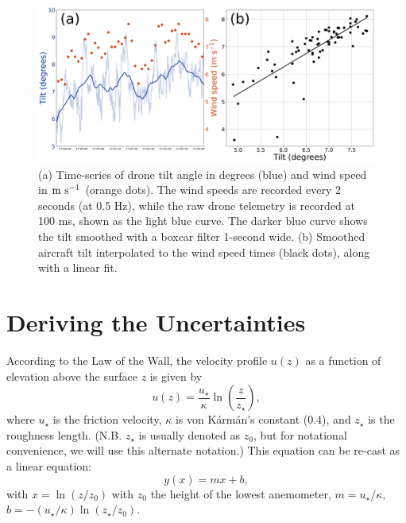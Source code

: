 \documentclass[linenumbers]{aastex631}
\begin{document}
\begin{figure}
    \centering
    \includegraphics[width=\textwidth]{figures and data/example_tilt_and_windspeed.jpg}
    \caption{(a) Time-series of drone tilt angle in degrees (blue) and wind speed in ${\rm m\ s^{-1}}$ (orange dots). The wind speeds are recorded every 2 seconds (at 0.5 Hz), while the raw drone telemetry is recorded at 100 ms, shown as the light blue curve. The darker blue curve shows the tilt smoothed with a boxcar filter 1-second wide. (b) Smoothed aircraft tilt interpolated to the wind speed times (black dots), along with a linear fit.}
    \label{fig:example_tilt_and_windspeed}
\end{figure}

\appendix
\section{Deriving the Uncertainties}

According to the Law of the Wall, the velocity profile $u(z)$ as a function of elevation above the surface $z$ is given by
\begin{equation}
    u(z) = \frac{u_\star}{\kappa} \ln \left( \frac{z}{z_\star} \right),\label{eqn:uz_profile}
\end{equation}
where $u_\star$ is the friction velocity, $\kappa$ is von K\'{a}rm\'{a}n's constant (0.4), and $z_\star$ is the roughness length. (N.B. $z_\star$ is usually denoted as $z_0$, but for notational convenience, we will use this alternate notation.) This equation can be re-cast as a linear equation:
\begin{equation}
    y(x) = m x + b,\label{eqn:linear_eqn}
\end{equation}
with $x = \ln \left( z/z_0 \right)$ with $z_0$ the height of the lowest anemometer, $m = u_\star/\kappa$, $b = -\left(u_\star/\kappa\right) \ln\left( z_\star/z_0 \right)$.
\end{document}
